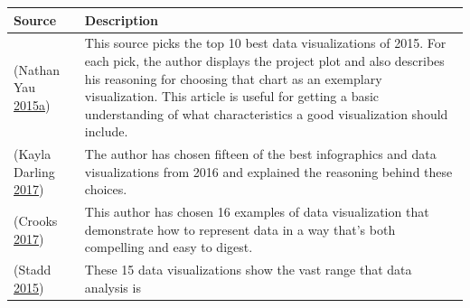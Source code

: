 \documentclass[]{book}
\begin{document}
\begin{longtable}[]{@{}ll@{}}
\toprule
\begin{minipage}[b]{0.15\columnwidth}\raggedright\strut
\textbf{Source}\strut
\end{minipage} & \begin{minipage}[b]{0.79\columnwidth}\raggedright\strut
\textbf{Description}\strut
\end{minipage}\tabularnewline
\midrule
\endhead
\begin{minipage}[t]{0.15\columnwidth}\raggedright\strut
(Nathan Yau
\protect\hyperlink{ref-10_best}{2015}\protect\hyperlink{ref-10_best}{a})\strut
\end{minipage} & \begin{minipage}[t]{0.79\columnwidth}\raggedright\strut
This source picks the top 10 best data visualizations of 2015. For each
pick, the author displays the project plot and also describes his
reasoning for choosing that chart as an exemplary visualization. This
article is useful for getting a basic understanding of what
characteristics a good visualization should include.\strut
\end{minipage}\tabularnewline
\begin{minipage}[t]{0.15\columnwidth}\raggedright\strut
(Kayla Darling \protect\hyperlink{ref-cool_data}{2017})\strut
\end{minipage} & \begin{minipage}[t]{0.79\columnwidth}\raggedright\strut
The author has chosen fifteen of the best infographics and data
visualizations from 2016 and explained the reasoning behind these
choices.\strut
\end{minipage}\tabularnewline
\begin{minipage}[t]{0.15\columnwidth}\raggedright\strut
(Crooks \protect\hyperlink{ref-int_viz_capt}{2017})\strut
\end{minipage} & \begin{minipage}[t]{0.79\columnwidth}\raggedright\strut
This author has chosen 16 examples of data visualization that
demonstrate how to represent data in a way that's both compelling and
easy to digest.\strut
\end{minipage}\tabularnewline
\begin{minipage}[t]{0.15\columnwidth}\raggedright\strut
(Stadd \protect\hyperlink{ref-15_mindblowing}{2015})\strut
\end{minipage} & \begin{minipage}[t]{0.79\columnwidth}\raggedright\strut
These 15 data visualizations show the vast range that data analysis is

\end{minipage}
\end{longtable}
\end{document}

